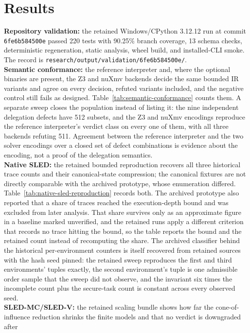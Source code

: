 \documentclass[11pt]{article}
\begin{document}
\section{Results}
\textbf{Repository validation:} the retained Windows/CPython 3.12.12 run at
commit \texttt{6fe6b584500e} passed 220 tests with 90.25\% branch coverage,
13 schema checks, deterministic regeneration, static analysis, wheel build,
and installed-CLI smoke. The record is
\texttt{research/output/validation/6fe6b584500e/}.\\
\textbf{Semantic conformance:} the reference interpreter and, where the optional
binaries are present, the Z3 and nuXmv backends decide the same bounded IR
variants and agree on every decision, refuted variants included, and the
negative control still fails as designed. Table~\ref{tab:semantic-conformance}
counts them. A separate sweep closes the
population instead of listing it: the nine independent delegation defects have
512 subsets, and the Z3 and nuXmv encodings reproduce the reference
interpreter's verdict class on every one of them, with all three backends
refuting 511. Agreement between the reference interpreter and the two solver
encodings over a closed set of defect combinations is evidence about the
encoding, not a proof of the delegation semantics.\\
\textbf{Native SLED:} the retained bounded reproduction recovers all three
historical trace counts and their canonical-state compression; the canonical
fixtures are not directly comparable with the archived prototype, whose
enumeration differed. Table~\ref{tab:native-sled-reproduction} records both.
The archived prototype also reported that a share of traces reached the
execution-depth bound and was excluded from later analysis. That share survives
only as an approximate figure in a baseline marked unverified, and the retained
runs apply a different criterion that records no trace hitting the bound, so the
table reports the bound and the retained count instead of recomputing the
share. The archived classifier behind the historical per-environment counters
is itself recovered from retained sources with the hash seed pinned: the
retained sweep reproduces the first and third environments' tuples exactly, the
second environment's tuple is one admissible order sample that the sweep did not
observe, and the invariant six times the incomplete count plus the secure-task
count is constant across every observed seed.\\
\textbf{SLED-MC/SLED-V:} the retained scaling bundle shows how far the
cone-of-influence reduction shrinks the finite models and that no verdict is downgraded after
\end{document}

